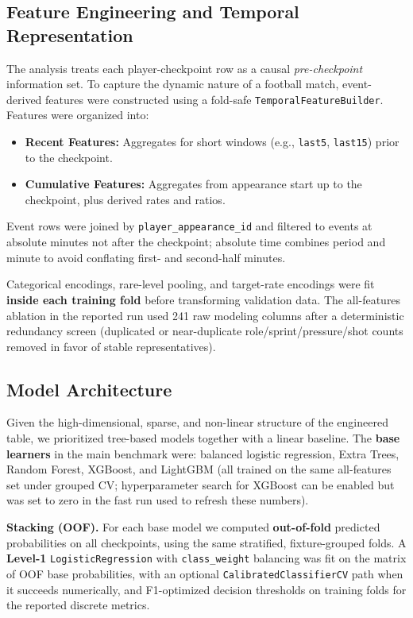 \documentclass[11pt, a4paper]{article}
\begin{document}
\subsection{Feature Engineering and Temporal Representation}
The analysis treats each player-checkpoint row as a causal \emph{pre-checkpoint} information set. To capture the dynamic nature of a football match, event-derived features were constructed using a fold-safe \texttt{TemporalFeatureBuilder}. Features were organized into:
\begin{itemize}
    \item \textbf{Recent Features:} Aggregates for short windows (e.g., \texttt{last5}, \texttt{last15}) prior to the checkpoint.
    \item \textbf{Cumulative Features:} Aggregates from appearance start up to the checkpoint, plus derived rates and ratios.
\end{itemize}

Event rows were joined by \texttt{player\_appearance\_id} and filtered to events at absolute minutes not after the checkpoint; absolute time combines period and minute to avoid conflating first- and second-half minutes.

Categorical encodings, rare-level pooling, and target-rate encodings were fit \textbf{inside each training fold} before transforming validation data. The all-features ablation in the reported run used 241 raw modeling columns after a deterministic redundancy screen (duplicated or near-duplicate role/sprint/pressure/shot counts removed in favor of stable representatives).

\subsection{Model Architecture}
Given the high-dimensional, sparse, and non-linear structure of the engineered table, we prioritized tree-based models together with a linear baseline. The \textbf{base learners} in the main benchmark were: balanced logistic regression, Extra Trees, Random Forest, XGBoost, and LightGBM (all trained on the same all-features set under grouped CV; hyperparameter search for XGBoost can be enabled but was set to zero in the fast run used to refresh these numbers). 

\textbf{Stacking (OOF).} For each base model we computed \textbf{out-of-fold} predicted probabilities on all checkpoints, using the same stratified, fixture-grouped folds. A \textbf{Level-1} \texttt{LogisticRegression} with \texttt{class\_weight} balancing was fit on the matrix of OOF base probabilities, with an optional \texttt{CalibratedClassifierCV} path when it succeeds numerically, and F1-optimized decision thresholds on training folds for the reported discrete metrics.
\end{document}
